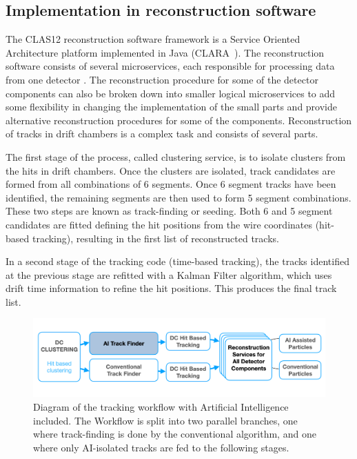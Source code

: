 \documentclass[aps,prl,preprint,12pt]{revtex4}
\begin{document}
\subsection{Implementation in reconstruction software}

The CLAS12 reconstruction software framework is a Service Oriented Architecture platform implemented in Java (CLARA~\cite{Gyurjyan:2011zz}).
The reconstruction software consists of several microservices, each responsible for processing data from one
detector \cite{Ziegler:2020gsr}. The reconstruction procedure for some of the detector components can also 
be broken down into smaller logical microservices to add some flexibility in changing the implementation of 
the small parts and provide alternative reconstruction procedures for some of the components. Reconstruction 
of tracks in drift chambers is a complex task and consists of several parts.

The first stage of the process, called clustering service, is to isolate clusters from the hits in drift chambers. 
Once the clusters are isolated, track candidates are formed from all combinations of 6 segments. Once 6 
segment tracks have been identified, the remaining segments are then used to form 5 segment combinations. 
These two steps are known as track-finding or seeding. Both 6 and 5 segment candidates are fitted defining 
the hit positions from the wire coordinates (hit-based tracking), resulting in the first list of reconstructed tracks.

In a second stage of the tracking code (time-based tracking), the tracks identified at the previous stage are 
refitted with a Kalman Filter algorithm, which uses drift time information to refine the hit positions. This 
produces the final track list.

\begin{figure}[!ht]
\begin{center}
 \includegraphics[width=6.0in]{images/CLARA_AI_diagram.png}
\caption {Diagram of the tracking workflow with Artificial Intelligence included. The Workflow is split into 
two parallel branches, one where track-finding is done by the conventional algorithm, and one where only 
AI-isolated tracks are fed to the following stages.}
 \label{recon:diagram}
 \end{center}
\end{figure}
\end{document}

